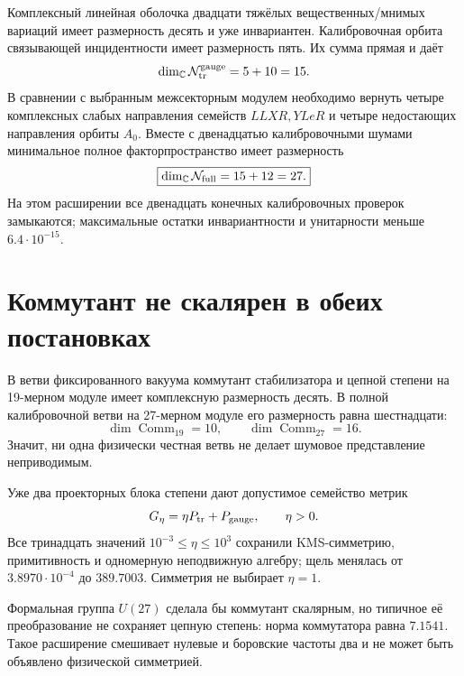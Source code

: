 Комплексный линейная оболочка двадцати тяжёлых вещественных/мнимых вариаций имеет размерность
десять и уже инвариантен. Калибровочная орбита связывающей инцидентности имеет
размерность пять. Их сумма прямая и даёт
\begin{equation}
 \dim_{\mathbb C}\mathcal N_{\rm tr}^{\rm gauge}=5+10=15.
 \label{eq:v8-full-gauge-transfer-dimension}
\end{equation}
В сравнении с выбранным межсекторным модулем необходимо вернуть четыре комплексных
слабых направления семейств $LLXR,YLeR$ и четыре недостающих направления
орбиты $A_0$. Вместе с двенадцатью калибровочными шумами минимальное полное факторпространство
имеет размерность
\begin{equation}
 \boxed{\dim_{\mathbb C}\mathcal N_{\rm full}=15+12=27.}
 \label{eq:v8-full-gauge-noise-dimension}
\end{equation}
На этом расширении все двенадцать конечных калибровочных проверок замыкаются;
максимальные остатки инвариантности и унитарности меньше $6.4\cdot10^{-15}$.

\section{Коммутант не скалярен в обеих постановках}

В ветви фиксированного вакуума коммутант стабилизатора и цепной степени на
19-мерном модуле имеет комплексную размерность десять. В полной калибровочной ветви
на 27-мерном модуле его размерность равна шестнадцати:
\begin{equation}
 \dim\operatorname{Comm}_{19}=10,
 \qquad
 \dim\operatorname{Comm}_{27}=16.
 \label{eq:v8-noise-symmetry-commutants}
\end{equation}
Значит, ни одна физически честная ветвь не делает шумовое представление
неприводимым.

Уже два проекторных блока степени дают допустимое семейство метрик
\begin{equation}
 G_\eta=\eta P_{\rm tr}+P_{\rm gauge},
 \qquad \eta>0.
 \label{eq:v8-symmetry-invariant-noise-family}
\end{equation}
Все тринадцать значений $10^{-3}\leq\eta\leq10^3$ сохранили KMS-симметрию,
примитивность и одномерную неподвижную алгебру; щель менялась от
$3.8970\cdot10^{-4}$ до $389.7003$. Симметрия не выбирает $\eta=1$.

Формальная группа $U(27)$ сделала бы коммутант скалярным, но типичное её
преобразование не сохраняет цепную степень: норма коммутатора равна
$7.1541$. Такое расширение смешивает нулевые и боровские частоты два и не
может быть объявлено физической симметрией.

